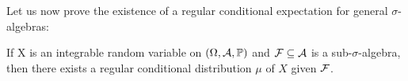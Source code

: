Let us now prove the existence of a regular conditional expectation for general $\sigma$-algebras:
\begin{lsuperwichtigersatzExistence}
\begin{theorem}\label{existence_regular_dist}
	If X is an integrable random variable on  $(\Omega,\mathcal{A},\mathbb{P})$ and $\mathcal{F} \subseteq  \mathcal{A}$ is a sub-$\sigma$-algebra, then there exists a regular conditional distribution $\mu$ of $X$ given $\mathcal{F}$.
\end{theorem}
\end{lsuperwichtigersatzExistence}



